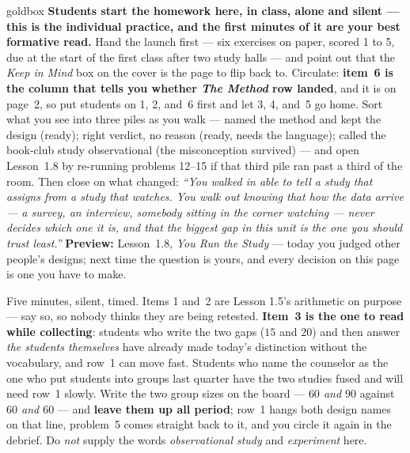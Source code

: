 \documentclass[10pt]{article}
\begin{document}
\boxguard
\begin{skillbox}{goldbox}
\textbf{Students start the homework here, in class, alone and silent --- this is the individual
practice, and the first minutes of it are your best formative read.} Hand the launch first ---
six exercises on paper, scored 1 to 5, due at the start of the first class after two study
halls --- and point out that the \emph{Keep in Mind} box on the cover is the page to flip back
to. Circulate: \textbf{item~6 is the column that tells you whether \emph{The Method} row
landed}, and it is on page~2, so put students on 1, 2, and~6 first and let 3, 4, and~5 go home.
Sort what you see into three piles as you walk --- named the method and kept the design
(ready); right verdict, no reason (ready, needs the language); called the book-club study
observational (the misconception survived) --- and open Lesson~1.8 by re-running problems 12--15
if that third pile ran past a third of the room. Then close on what changed: \emph{``You walked
in able to tell a study that assigns from a study that watches. You walk out knowing that how
the data arrive --- a survey, an interview, somebody sitting in the corner watching --- never
decides which one it is, and that the biggest gap in this unit is the one you should trust
least.''} \textbf{Preview:} Lesson~1.8, \emph{You Run the Study} --- today you judged other
people's designs; next time the question is yours, and every decision on this page is one you
have to make.
\end{skillbox}

\begin{teachernote}[Warm-Up]
Five minutes, silent, timed. Items 1 and~2 are Lesson 1.5's arithmetic on purpose --- say so, so
nobody thinks they are being retested. \textbf{Item~3 is the one to read while collecting}:
students who write the two gaps ($15$ and $20$) and then answer \emph{the students themselves}
have already made today's distinction without the vocabulary, and row~1 can move fast. Students
who name the counselor as the one who put students into groups last quarter have the two studies
fused and will need row~1 slowly. Write the two group sizes on the board --- \emph{$60$ and
$90$} against \emph{$60$ and $60$} --- and \textbf{leave them up all period}; row~1 hangs both
design names on that line, problem~5 comes straight back to it, and you circle it again in the
debrief. Do \emph{not} supply the words \emph{observational study} and \emph{experiment} here.
\end{teachernote}
\end{document}
